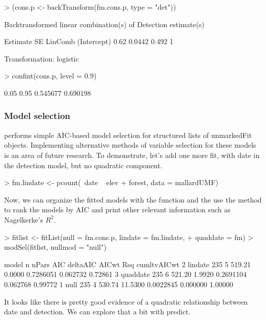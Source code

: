 \documentclass[article,shortnames]{jss}
\begin{document}
\begin{Schunk}
\begin{Sinput}
> (cons.p <- backTransform(fm.cons.p, type = "det"))
\end{Sinput}
\begin{Soutput}
Backtransformed linear combination(s) of Detection estimate(s)

 Estimate     SE LinComb (Intercept)
     0.62 0.0442   0.492           1

Transformation: logistic 
\end{Soutput}
\begin{Sinput}
> confint(cons.p, level = 0.9)
\end{Sinput}
\begin{Soutput}
     0.05     0.95
 0.545677 0.690198
\end{Soutput}
\end{Schunk}

\subsubsection{Model selection}

 performs simple AIC-based model selection for
structured lists of unmarkedFit objects.  %
Implementing alternative methods of
variable selection for these models is an area of future research.
To demonstrate, let's add one more fit, with date in the detection model,
but no quadratic component.

\begin{Schunk}
\begin{Sinput}
> fm.lindate <- pcount(~date ~ elev + forest, data = mallardUMF)
\end{Sinput}
\end{Schunk}

Now, we can organize the fitted models with the  function and
the use the  method to rank the models by AIC and print
other relevant information such as Nagelkerke's
\citeyearpar{Nagelkerke1991} $R^{2}$.

\begin{Schunk}
\begin{Sinput}
> fitlist <- fitList(null = fm.cons.p, lindate = fm.lindate, 
+     quaddate = fm)
> modSel(fitlist, nullmod = "null")
\end{Sinput}
\begin{Soutput}
     model   n nPars    AIC deltaAIC     AICwt      Rsq cumltvAICwt
2  lindate 235     5 519.21   0.0000 0.7286051 0.062732     0.72861
3 quaddate 235     6 521.20   1.9920 0.2691104 0.062768     0.99772
1     null 235     4 530.74  11.5300 0.0022845 0.000000     1.00000
\end{Soutput}
\end{Schunk}
It looks like there is pretty good evidence of a quadratic
relationship between date and detection.  We can explore that a bit
with predict.
\end{document}

